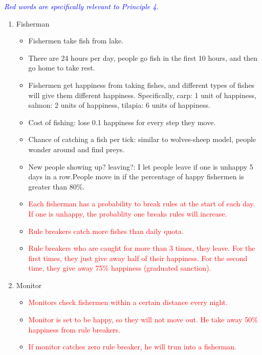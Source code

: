 \documentclass[12pt]{article}
\begin{document}
\textit{\textcolor{blue}{Red words are specifically relevant to Principle 4.}}
\begin{enumerate}
	
	\item Fisherman
	\begin{itemize}
		\item Fishermen take fish from lake.
		\item There are 24 hours per day, people go fish in the first 10 hours, and then go home to take rest.
		\item Fishermen get happiness from taking fishes, and different types of fishes will give them different happiness. Specifically, carp: 1 unit of happiness, salmon: 2 units of happiness, tilapia: 6 units of happiness.
		\item Cost of fishing: lose 0.1 happiness for every step they move.
		\item Chance of catching a fish per tick: similar to wolves-sheep model, people wonder around and find preys.
		\item New people showing up? leaving?: I let people leave if one is unhappy 5 days in a row.People move in if the percentage of happy fishermen is greater than 80\%.
		\item \textcolor{red}{Each fisherman has a probability to break rules at the start of each day. If one is unhappy, the probablity one breaks rules will increase.}
		\item \textcolor{red}{Rule breakers catch more fishes than daily quota.}
		\item \textcolor{red}{Rule breakers who are caught for more than 3 times, they leave. For the first times, they just give away half of their happiness. For the second time, they give away 75\% happiness (graduated sanction).}
	\end{itemize}

    
    \item Monitor
    \begin{itemize}
    	\item \textcolor{red}{Monitors check fishermen within a certain distance every night.}
    	\item \textcolor{red}{Monitor is set to be happy, so they will not move out. He take away 50\% happiness from rule breakers.}
    	\item {\textcolor{red}{If monitor catches zero rule breaker, he will trun into a fisherman.}}
    \end{itemize}


\end{enumerate}
\end{document}
